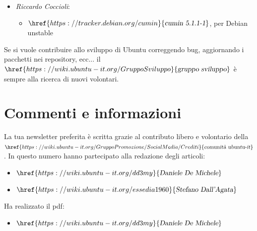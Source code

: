 \documentclass[a4paper,twoside]{article}
\begin{document}
\begin{itemize}
\item \textit{Riccardo Coccioli}:
\begin{itemize}
\item $\href{https://tracker.debian.org/cumin}{\textsl{cumin 5.1.1-1}}$, per Debian unstable
\end{itemize}
\end{itemize}

Se si vuole contribuire allo sviluppo di Ubuntu correggendo bug, aggiornando i pacchetti nei repository, ecc... il $\href{https://wiki.ubuntu-it.org/GruppoSviluppo}{\textsl{gruppo sviluppo}}$ è sempre alla ricerca di nuovi volontari.

\section{Commenti e informazioni}
La tua newsletter preferita è scritta grazie al contributo libero e volontario della $\href{https://wiki.ubuntu-it.org/GruppoPromozione/SocialMedia/Crediti}{\textsl{comunità ubuntu-it}}$. In questo numero hanno partecipato alla redazione degli articoli:

\begin{itemize}
\item $\href{https://wiki.ubuntu-it.org/dd3my}{\textsl{Daniele De Michele}}$
\item $\href{https://wiki.ubuntu-it.org/essedia1960}{\textsl{Stefano Dall'Agata}}$
\end{itemize}

Ha realizzato il pdf:

\begin{itemize}
\item $\href{https://wiki.ubuntu-it.org/dd3my}{\textsl{Daniele De Michele}}$
\end{itemize}
\end{document}
